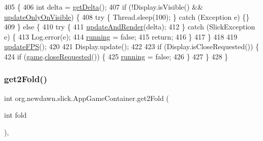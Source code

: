 \begin{DoxyCode}
405                                                     \{
406         \textcolor{keywordtype}{int} delta = \mbox{\hyperlink{classorg_1_1newdawn_1_1slick_1_1_game_container_a47af7100d91a7101cb71574dc70fb0dc}{getDelta}}();
407         \textcolor{keywordflow}{if} (!Display.isVisible() && \mbox{\hyperlink{classorg_1_1newdawn_1_1slick_1_1_app_game_container_a8ed58465ae60f67d13fa69ea7929d3ef}{updateOnlyOnVisible}}) \{
408             \textcolor{keywordflow}{try} \{ Thread.sleep(100); \} \textcolor{keywordflow}{catch} (Exception e) \{\}
409         \} \textcolor{keywordflow}{else} \{
410             \textcolor{keywordflow}{try} \{
411                 \mbox{\hyperlink{classorg_1_1newdawn_1_1slick_1_1_game_container_a91b4f51ca42ad0b9dcca0e9fc2118f9f}{updateAndRender}}(delta);
412             \} \textcolor{keywordflow}{catch} (SlickException e) \{
413                 Log.error(e);
414                 \mbox{\hyperlink{classorg_1_1newdawn_1_1slick_1_1_game_container_a5cb10a093281abb5b6ee60f2b18c26c3}{running}} = \textcolor{keyword}{false};
415                 \textcolor{keywordflow}{return};
416             \}
417         \}
418 
419         \mbox{\hyperlink{classorg_1_1newdawn_1_1slick_1_1_game_container_a3894fc3250d4731e4218bc69bfc281df}{updateFPS}}();
420 
421         Display.update();
422         
423         \textcolor{keywordflow}{if} (Display.isCloseRequested()) \{
424             \textcolor{keywordflow}{if} (\mbox{\hyperlink{classorg_1_1newdawn_1_1slick_1_1_game_container_a6a38bb26e45e1c884940caf35c7cfcdc}{game}}.\mbox{\hyperlink{interfaceorg_1_1newdawn_1_1slick_1_1_game_a186989e6f05f917447c004adfe2f2332}{closeRequested}}()) \{
425                 \mbox{\hyperlink{classorg_1_1newdawn_1_1slick_1_1_game_container_a5cb10a093281abb5b6ee60f2b18c26c3}{running}} = \textcolor{keyword}{false};
426             \}
427         \}
428     \}
\end{DoxyCode}
\mbox{\label{classorg_1_1newdawn_1_1slick_1_1_app_game_container_afb2ee604fe80d51043a90848472a7e11}} 
\subsubsection{\texorpdfstring{get2\+Fold()}{get2Fold()}}
{\footnotesize\ttfamily int org.\+newdawn.\+slick.\+App\+Game\+Container.\+get2\+Fold (\begin{DoxyParamCaption}\item[{int}]{fold }\end{DoxyParamCaption})\hspace{0.3cm}{\ttfamily [inline]}, {\ttfamily [private]}}

